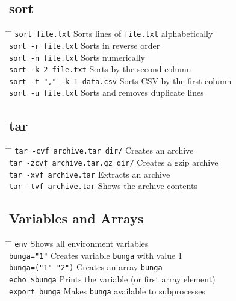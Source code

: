 \documentclass[a4paper,10pt]{article}
\begin{document}
\subsection{sort}
\begin{tabbing}
	\= \hspace{60mm} \= \hspace{80mm} \kill
	\> \verb|sort file.txt| \> Sorts lines of \verb|file.txt| alphabetically \\
	\> \verb|sort -r file.txt| \> Sorts in reverse order \\
	\> \verb|sort -n file.txt| \> Sorts numerically \\
	\> \verb|sort -k 2 file.txt| \> Sorts by the second column \\
	\> \verb|sort -t "," -k 1 data.csv| \> Sorts CSV by the first column \\
	\> \verb|sort -u file.txt| \> Sorts and removes duplicate lines \\
\end{tabbing}

\subsection{tar}
\begin{tabbing}
	\= \hspace{30mm} \= \hspace{50mm} \kill
	\> \verb|tar -cvf archive.tar dir/| \> Creates an archive \\
	\> \verb|tar -zcvf archive.tar.gz dir/| \> Creates a gzip archive \\
	\> \verb|tar -xvf archive.tar| \> Extracts an archive \\
	\> \verb|tar -tvf archive.tar| \> Shows the archive contents \\
\end{tabbing}

\subsection{Variables and Arrays}
\begin{tabbing}
	\= \hspace{30mm} \= \hspace{50mm} \kill
	\> \verb|env| \> Shows all environment variables \\
	\> \verb|bunga="1"| \> Creates variable \verb|bunga| with value 1 \\
	\> \verb|bunga=("1" "2")| \> Creates an array \verb|bunga| \\
	\> \verb|echo $bunga| \> Prints the variable (or first array element) \\
	\> \verb|export bunga| \> Makes \verb|bunga| available to subprocesses \\
\end{tabbing}
\end{document}
